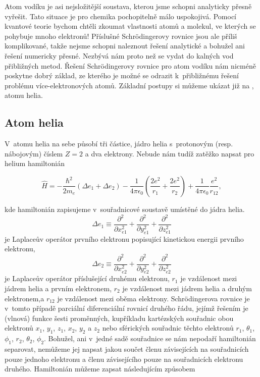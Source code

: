 Atom vodíku je asi nejsložitější soustava, kterou jsme schopni analyticky přesně vyřešit. Tato situace je pro chemika pochopitelně málo uspokojivá. Pomocí kvantové teorie bychom chtěli zkoumat vlastnosti atomů a molekul, ve kterých se pohybuje mnoho elektronů! Příslušné Schr\"odingerovy rovnice jsou ale příliš komplikované, takže nejsme schopni naleznout řešení analytické a bohužel ani řešení numericky přesné. Nezbývá nám proto než se vydat do kalných vod přibližných metod. Řešení Schr\"odingerovy rovnice pro atom vodíku nám nicméně poskytne dobrý základ, ze kterého je možné se odrazit k~přibližnému řešení problému více-elektronových atomů. Základní postupy si můžeme ukázat již na , atomu helia.  

\subsection{Atom helia}
V~atomu helia na sebe působí tři částice, jádro helia s~protonovým (resp. nábojovým) číslem $Z = 2$ a dva elektrony. Nebude nám tudíž zatěžko napsat pro helium hamiltonián 

\begin{equation}
\hat{H} = - \frac{\hbar^2}{2 m_e} \left( \Delta e_1 + \Delta e_2 \right) - \frac{1}{4 \pi \epsilon_0} \left(\frac{2e^2}{r_1} + \frac{2e^2}{r_2} \right) + \frac{1}{4 \pi \epsilon_0} \frac{e^2}{r_{12}},
\label{rov:VE-1}
\end{equation}


\noindent kde hamiltonián zapisujeme v~souřadnicové soustavě umístěné do jádra helia.
\begin{equation}
\Delta e_1 \equiv \frac{\partial^2}{\partial x_{e1}^2} + \frac{\partial^2}{\partial y_{e1}^2}+\frac{\partial^2}{\partial z_{e1}^2} \nonumber
\end{equation}
je Laplaceův operátor prvního elektronu popisující kinetickou energii prvního elektronu,
\begin{equation}
\Delta e_2 \equiv \frac{\partial^2}{\partial x_{e2}^2} + \frac{\partial^2}{\partial y_{e2}^2}+\frac{\partial^2}{\partial z_{e2}^2} \nonumber
\end{equation}
je Laplaceův operátor příslušející druhému elektronu, $r_1$ je vzdálenost mezi jádrem helia a prvním elektronem, $r_2$ je vzdálenost mezi jádrem helia a druhým elektronem,a $r_{12}$ je vzdálenost mezi oběma elektrony. Schr\"odingerova rovnice je v~tomto případě parciální diferenciální rovnicí druhého řádu, jejímž řešením je (vlnová) funkce šesti proměnných, kupříkladu kartézských souřadnic obou elektronů $x_1$, $y_1$, $z_1$, $x_2$, $y_2$ a $z_2$ nebo sférických souřadnic těchto elektronů $r_1$, $\theta_1$, $\phi_1$, $r_2$, $\theta_2$, $\phi_2$. Bohužel, ani v~jedné sadě souřadnice se nám nepodaří hamiltonián separovat, nemůžeme jej napsat jakou součet členu závisejících na souřadnicích pouze jednoho elektronu a členu závisejícího pouze na souřadnicích elektronu druhého. Hamiltonián můžeme zapsat následujícím způsobem

